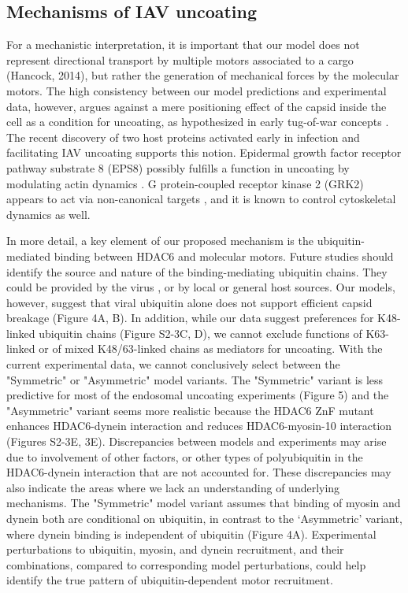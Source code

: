 \subsection{Mechanisms of IAV uncoating}

For a mechanistic interpretation, it is important that our model does not represent directional transport by multiple motors associated to a cargo (Hancock, 2014), but rather the generation of mechanical forces by the molecular motors. The high consistency between our model predictions and experimental data, however, argues against a mere positioning effect of the capsid inside the cell as a condition for uncoating, as hypothesized in early tug-of-war concepts \cite{lukic2014hiv, radtke2010plus}. The recent discovery of two host proteins activated early in infection and facilitating IAV uncoating supports this notion. Epidermal growth factor receptor pathway substrate 8 (EPS8) possibly fulfills a function in uncoating by modulating actin dynamics \cite{larson2019eps8}. G protein-coupled receptor kinase 2 (GRK2) appears to act via non-canonical targets \cite{yanguez2018phosphoproteomic}, and it is known to control cytoskeletal dynamics as well.

In more detail, a key element of our proposed mechanism is the ubiquitin-mediated binding between HDAC6 and molecular motors. Future studies should identify the source and nature of the binding-mediating ubiquitin chains. They could be provided by the virus \cite{banerjee2014influenza}, or by local or general host sources. Our models, however, suggest that viral ubiquitin alone does not support efficient capsid breakage (Figure 4A, B). In addition, while our data suggest preferences for K48-linked ubiquitin chains (Figure S2-3C, D), we cannot exclude functions of K63-linked or of mixed K48/63-linked chains as mediators for uncoating. With the current experimental data, we cannot conclusively select between the "Symmetric" or "Asymmetric" model variants. The "Symmetric" variant is less predictive for most of the endosomal uncoating experiments (Figure 5) and the "Asymmetric" variant seems more realistic because the HDAC6 ZnF mutant enhances HDAC6-dynein interaction and reduces HDAC6-myosin-10 interaction (Figures S2-3E, 3E). Discrepancies between models and experiments may arise due to involvement of other factors, or other types of polyubiquitin in the HDAC6-dynein interaction that are not accounted for. These discrepancies may also indicate the areas where we lack an understanding of underlying mechanisms. The "Symmetric" model variant assumes that binding of myosin and dynein both are conditional on ubiquitin, in contrast to the ‘Asymmetric’ variant, where dynein binding is independent of ubiquitin (Figure 4A). Experimental perturbations to ubiquitin, myosin, and dynein recruitment, and their combinations, compared to corresponding model perturbations, could help identify the true pattern of ubiquitin-dependent motor recruitment.


